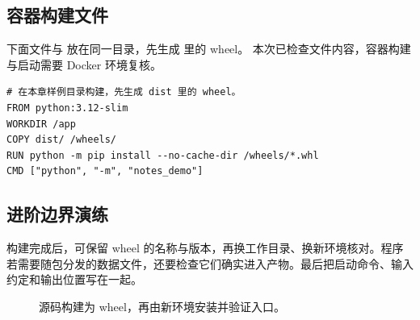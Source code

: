 \subsection*{容器构建文件}
下面文件与  放在同一目录，先生成  里的 wheel。
本次已检查文件内容，容器构建与启动需要 Docker 环境复核。
\begin{lstlisting}[language={},title={\code{Dockerfile}}]
# 在本章样例目录构建，先生成 dist 里的 wheel。
FROM python:3.12-slim
WORKDIR /app
COPY dist/ /wheels/
RUN python -m pip install --no-cache-dir /wheels/*.whl
CMD ["python", "-m", "notes_demo"]
\end{lstlisting}

\subsection*{进阶边界演练}
构建完成后，可保留 wheel 的名称与版本，再换工作目录、换新环境核对。程序若需要随包分发的数据文件，还要检查它们确实进入产物。最后把启动命令、输入约定和输出位置写在一起。

\begin{figure}[htbp]
\centering
{}
\caption{源码构建为 wheel，再由新环境安装并验证入口。}
\label{fig:visual-ch17}
\end{figure}


